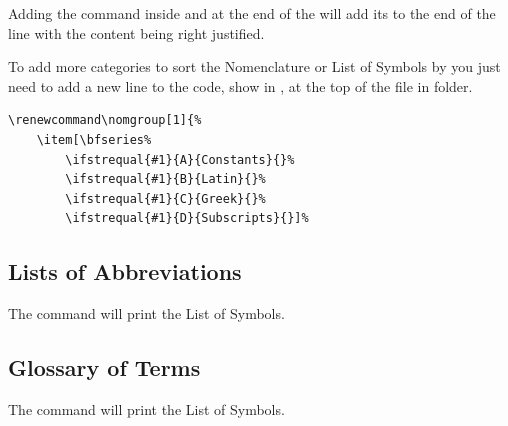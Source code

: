 			Adding the  command inside and at the end of the  will add its  to the end of the line with the content being right justified.

			To add more categories to sort the Nomenclature or List of Symbols by you just need to add a new line to the code, show in , at the top of the  file in  folder.
			
			\begin{lstlisting}[caption=Nomenclature Grouping Settings,label=lst:nomencalturesettings]
\renewcommand\nomgroup[1]{%
	\item[\bfseries%
		\ifstrequal{#1}{A}{Constants}{}%
		\ifstrequal{#1}{B}{Latin}{}%
		\ifstrequal{#1}{C}{Greek}{}%
		\ifstrequal{#1}{D}{Subscripts}{}]%
			\end{lstlisting}

		\subsection{Lists of Abbreviations}
			The  command will print the List of Symbols.
			\begin{center}
			\end{center}

		\subsection{Glossary of Terms}
			The  command will print the List of Symbols.
			\begin{center}
			\end{center}

